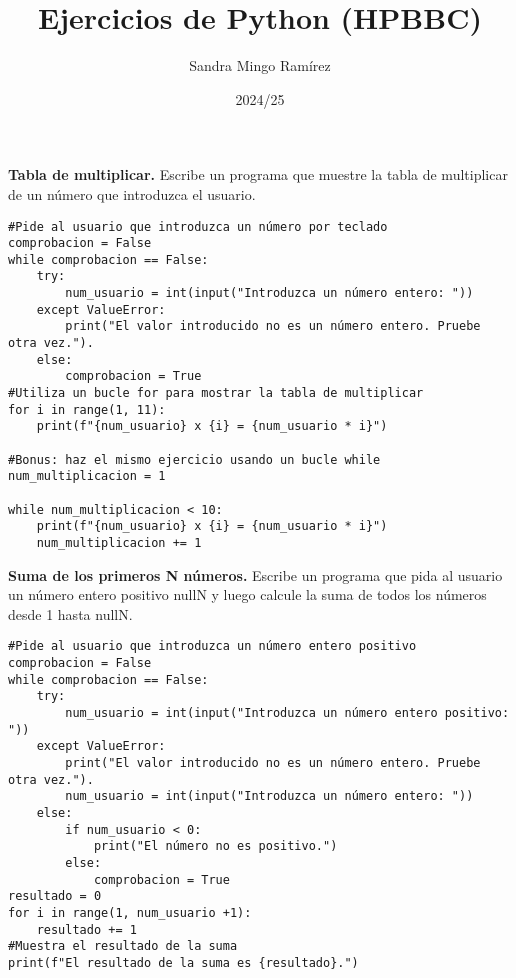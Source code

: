 \documentclass{config/ejercicios}
\title{Ejercicios de Python (HPBBC)}
\author{Sandra Mingo Ramírez}
\date{2024/25}
\begin{document}
\maketitle

\begin{problemS} \textbf{Tabla de multiplicar.}
Escribe un programa que muestre la tabla de multiplicar de un número que introduzca el usuario.
\begin{lstlisting}
#Pide al usuario que introduzca un número por teclado
comprobacion = False
while comprobacion == False:
	try:
		num_usuario = int(input("Introduzca un número entero: "))
	except ValueError:
		print("El valor introducido no es un número entero. Pruebe otra vez.").
	else:
		comprobacion = True
#Utiliza un bucle for para mostrar la tabla de multiplicar
for i in range(1, 11):
	print(f"{num_usuario} x {i} = {num_usuario * i}")
	
#Bonus: haz el mismo ejercicio usando un bucle while
num_multiplicacion = 1

while num_multiplicacion < 10:
	print(f"{num_usuario} x {i} = {num_usuario * i}")
	num_multiplicacion += 1
\end{lstlisting}
\end{problemS}

\begin{problemS} \textbf{Suma de los primeros N números.}
Escribe un programa que pida al usuario un número entero positivo nullN y luego calcule la suma de todos los números desde 1 hasta nullN.
\begin{lstlisting}
#Pide al usuario que introduzca un número entero positivo
comprobacion = False
while comprobacion == False:
	try:
		num_usuario = int(input("Introduzca un número entero positivo: "))
	except ValueError:
		print("El valor introducido no es un número entero. Pruebe otra vez.").
		num_usuario = int(input("Introduzca un número entero: "))
	else:
		if num_usuario < 0:
			print("El número no es positivo.")
		else:
			comprobacion = True
resultado = 0
for i in range(1, num_usuario +1):
	resultado += 1
#Muestra el resultado de la suma
print(f"El resultado de la suma es {resultado}.")
\end{lstlisting}
\end{problemS}
\end{document}
